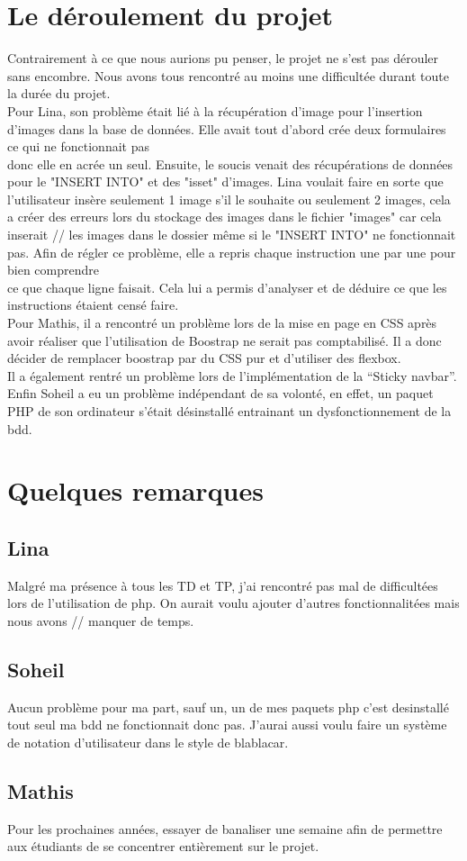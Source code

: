\documentclass[11pt,a4paper]{article}
\begin{document}
\section{Le déroulement du projet}
Contrairement à ce que nous aurions pu penser, le projet ne s'est pas dérouler sans encombre. Nous avons tous rencontré au moins une difficultée durant toute la durée du projet.\\
Pour Lina, son problème était lié à la récupération d'image pour l'insertion d'images dans la base de données. Elle avait tout d'abord crée deux formulaires ce qui ne fonctionnait pas \\
donc elle en acrée un seul. Ensuite, le soucis venait des récupérations de données pour le "INSERT INTO" et des "isset" d'images. Lina voulait faire en sorte que\\
l'utilisateur insère seulement 1 image s'il le souhaite ou seulement 2 images, cela a créer des erreurs lors du stockage des images dans le fichier "images" car cela inserait //
les images dans le dossier même si le "INSERT INTO" ne fonctionnait pas. Afin de régler ce problème, elle a repris chaque instruction une par une pour bien comprendre\\
ce que chaque ligne faisait. Cela lui a permis d'analyser et de déduire ce que les instructions étaient censé faire.\\
Pour Mathis, il a rencontré un problème lors de la mise en page en CSS après avoir réaliser que l'utilisation de Boostrap ne serait pas comptabilisé. Il a donc décider de remplacer boostrap par du CSS pur et d'utiliser des flexbox.\\
Il a également rentré un problème lors de l'implémentation de la ``Sticky navbar''.\\
Enfin Soheil a eu un problème indépendant de sa volonté, en effet, un paquet PHP de son ordinateur s'était désinstallé entrainant un dysfonctionnement de la bdd.

\section{Quelques remarques}
\subsection*{Lina}
Malgré ma présence à tous les TD et TP, j'ai rencontré pas mal de difficultées lors de l'utilisation de php. On aurait voulu ajouter d'autres fonctionnalitées mais nous avons //
manquer de temps.
\subsection*{Soheil}
Aucun problème pour ma part, sauf un, un de mes paquets php c'est desinstallé tout seul ma bdd ne fonctionnait donc pas. J'aurai aussi voulu faire un système de notation d'utilisateur dans le style de blablacar.
\subsection*{Mathis}
Pour les prochaines années, essayer de banaliser une semaine afin de permettre aux étudiants de se concentrer entièrement sur le projet.
\end{document}
